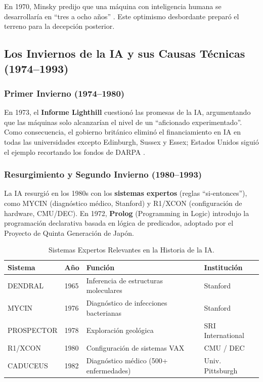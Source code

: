 \documentclass[12pt,a4paper]{article}
\begin{document}
En 1970, Minsky predijo que una máquina con inteligencia humana se desarrollaría en ``tres a ocho años'' \citep{haenlein2019}. Este optimismo desbordante preparó el terreno para la decepción posterior.

\subsection{Los Inviernos de la IA y sus Causas Técnicas (1974--1993)}

\subsubsection{Primer Invierno (1974--1980)}

En 1973, el \textbf{Informe Lighthill} cuestionó las promesas de la IA, argumentando que las máquinas solo alcanzarían el nivel de un ``aficionado experimentado''. Como consecuencia, el gobierno británico eliminó el financiamiento en IA en todas las universidades excepto Edinburgh, Sussex y Essex; Estados Unidos siguió el ejemplo recortando los fondos de DARPA \citep{haenlein2019}.

\subsubsection{Resurgimiento y Segundo Invierno (1980--1993)}

La IA resurgió en los 1980s con los \textbf{sistemas expertos} (reglas ``si-entonces''), como MYCIN (diagnóstico médico, Stanford) y R1/XCON (configuración de hardware, CMU/DEC). En 1972, \textbf{Prolog} (Programming in Logic) introdujo la programación declarativa basada en lógica de predicados, adoptado por el Proyecto de Quinta Generación de Japón.

\begin{table}[htbp]
    \centering
    \caption{Sistemas Expertos Relevantes en la Historia de la IA.}
    \label{tab:sistemas_expertos}
    \begin{tabular}{@{}llC{5.5cm}l@{}}
        \toprule
        \textbf{Sistema} & \textbf{Año} & \textbf{Función} & \textbf{Institución} \\ \midrule
        DENDRAL & 1965 & Inferencia de estructuras moleculares & Stanford \\
        MYCIN & 1976 & Diagnóstico de infecciones bacterianas & Stanford \\
        PROSPECTOR & 1978 & Exploración geológica & SRI International \\
        R1/XCON & 1980 & Configuración de sistemas VAX & CMU / DEC \\
        CADUCEUS & 1982 & Diagnóstico médico (500+ enfermedades) & Univ. Pittsburgh \\ \bottomrule
    \end{tabular}
\end{table}
\end{document}
